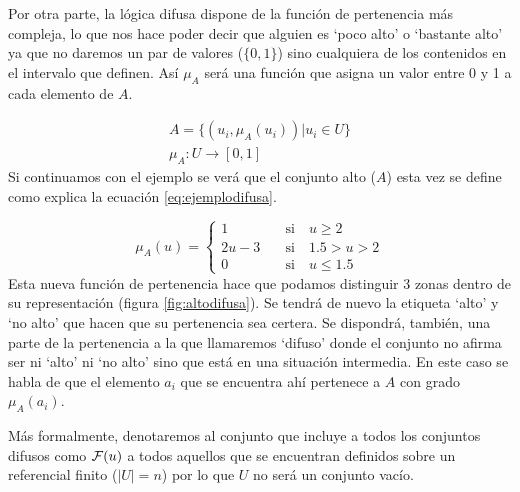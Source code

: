 \documentclass[main]{subfiles}
\begin{document}


Por otra parte, la lógica difusa dispone de la función de pertenencia más compleja, lo que nos hace poder decir que alguien es `poco alto' o `bastante alto' ya que no daremos un par de valores ($\{0,1\}$) sino cualquiera de los contenidos en el intervalo que definen. Así $\mu_{A}$ será una función que asigna un valor entre 0 y 1 a cada elemento de $A$.

\begin{equation}\label{eq:logicadifusa}
\begin{aligned}
	A = \{(u_{i}, \mu_{A}(u_{i})) | u_{i}\in U\}\\
	\mu_{A}:U\rightarrow [0,1]
\end{aligned}
\end{equation}
Si continuamos con el ejemplo se verá que el conjunto alto ($A$) esta vez se define como explica la ecuación \ref{eq:ejemplodifusa}.

\begin{equation}\label{eq:ejemplodifusa}
	\mu_{A}(u) = \left\{ \begin{aligned}
		1 \quad&\text{si}\quad u\geq 2\\
		2u - 3 \quad&\text{si}\quad 1.5>u>2\\
		0 \quad&\text{si}\quad u\leq 1.5
 	\end{aligned}\right.
 \end{equation}
Esta nueva función de pertenencia hace que podamos distinguir 3 zonas dentro de su representación (figura \ref{fig:altodifusa}). Se tendrá de nuevo la etiqueta `alto' y `no alto' que hacen que su pertenencia sea certera. Se dispondrá, también, una parte de la pertenencia a la que llamaremos `difuso' donde el conjunto no afirma ser ni `alto' ni `no alto' sino que está en una situación intermedia. En este caso se habla de que el elemento $a_{i}$ que se encuentra ahí pertenece a $A$ con grado $\mu_{A}(a_{i})$.



Más formalmente, denotaremos al conjunto que incluye a todos los conjuntos difusos como $\mathcal{F}(u)$ a todos aquellos que se encuentran definidos sobre un referencial finito ($|U| = n$) por lo que $U$ no será un conjunto vacío.
\end{document}
